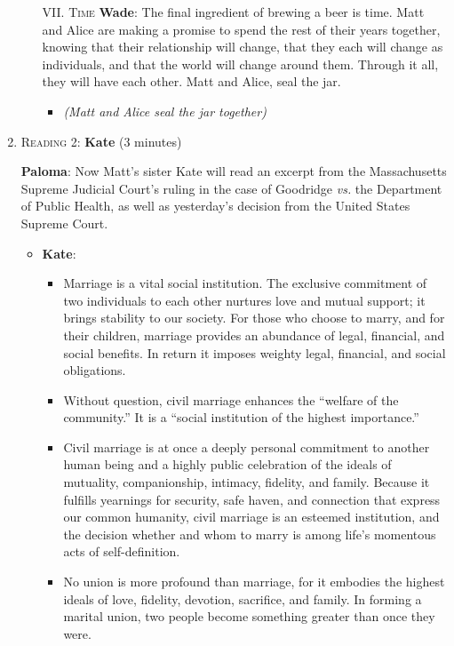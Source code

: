 \documentclass[12pt]{article}
\begin{document}
\begin{enumerate}
\begin{itemize}
    
  \item [VII.] \textsc{Time}
    {\bf Wade}: The final ingredient of brewing a beer is time. Matt and Alice are making a promise to spend the rest of their years together, knowing that their relationship will change, that they each will change as individuals, and that the world will change around them. Through it all, they will have each other. Matt and Alice, seal the jar.
    \begin{itemize}
    \item \textit{(Matt and Alice seal the jar together)}
    \end{itemize}
  \end{itemize}


\item \textsc{Reading 2}: {\bf Kate} (3 minutes)

  {\bf Paloma}: Now Matt's sister Kate will read an excerpt from the Massachusetts Supreme Judicial Court's ruling in the case of Goodridge \textit{vs.} the Department of Public Health, as well as yesterday's decision from the United States Supreme Court.

  \newpage

  \begin{itemize}
  \item {\bf Kate}:
    \begin{itemize}
    \item Marriage is a vital social institution. The exclusive commitment of two individuals to each other nurtures love and mutual support; it brings stability to our society. For those who choose to marry, and for their children, marriage provides an abundance of legal, financial, and social benefits. In return it imposes weighty legal, financial, and social obligations.

    \item Without question, civil marriage enhances the ``welfare of the community.'' It is a ``social institution of the highest importance.''

    \item Civil marriage is at once a deeply personal commitment to another human being and a highly public celebration of the ideals of mutuality, companionship, intimacy, fidelity, and family. Because it fulfills yearnings for security, safe haven, and connection that express our common humanity, civil marriage is an esteemed institution, and the decision whether and whom to marry is among life's momentous acts of self-definition.

    \item No union is more profound than marriage, for it embodies the highest ideals of love, fidelity, devotion, sacrifice, and family. In forming a marital union, two people become something greater than once they were.


\end{itemize}
\end{itemize}
\end{enumerate}
\end{document}
